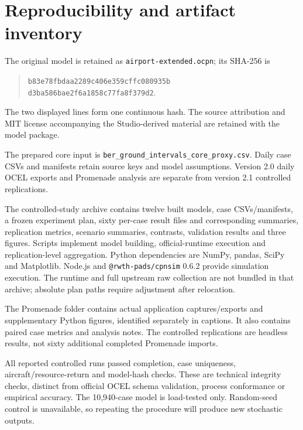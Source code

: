 \chapter{Reproducibility and artifact inventory}
\label{app:repro}
The original model is retained as \texttt{airport-extended.ocpn}; its SHA-256 is
\begin{quote}\footnotesize\texttt{b83e78fbdaa2289c406e359cffc080935b}\\
\texttt{d3ba586bae2f6a1858c77fa8f379d2}.\end{quote}
The two displayed lines form one continuous hash. The source attribution and MIT license accompanying the Studio-derived material are retained with the model package.

The prepared core input is \texttt{ber\_ground\_intervals\_core\_proxy.csv}. Daily case CSVs and manifests retain source keys and model assumptions. Version 2.0 daily OCEL exports and Promenade analysis are separate from version 2.1 controlled replications.

The controlled-study archive contains twelve built models, case CSVs/manifests, a frozen experiment plan, sixty per-case result files and corresponding summaries, replication metrics, scenario summaries, contrasts, validation results and three figures. Scripts implement model building, official-runtime execution and replication-level aggregation. Python dependencies are NumPy, pandas, SciPy and Matplotlib. Node.js and \texttt{@rwth-pads/cpnsim} 0.6.2 provide simulation execution. The runtime and full upstream raw collection are not bundled in that archive; absolute plan paths require adjustment after relocation.

The Promenade folder contains actual application captures/exports and supplementary Python figures, identified separately in captions. It also contains paired case metrics and analysis notes. The controlled replications are headless results, not sixty additional completed Promenade imports.

All reported controlled runs passed completion, case uniqueness, aircraft/resource-return and model-hash checks. These are technical integrity checks, distinct from official OCEL schema validation, process conformance or empirical accuracy. The 10,940-case model is load-tested only. Random-seed control is unavailable, so repeating the procedure will produce new stochastic outputs.
